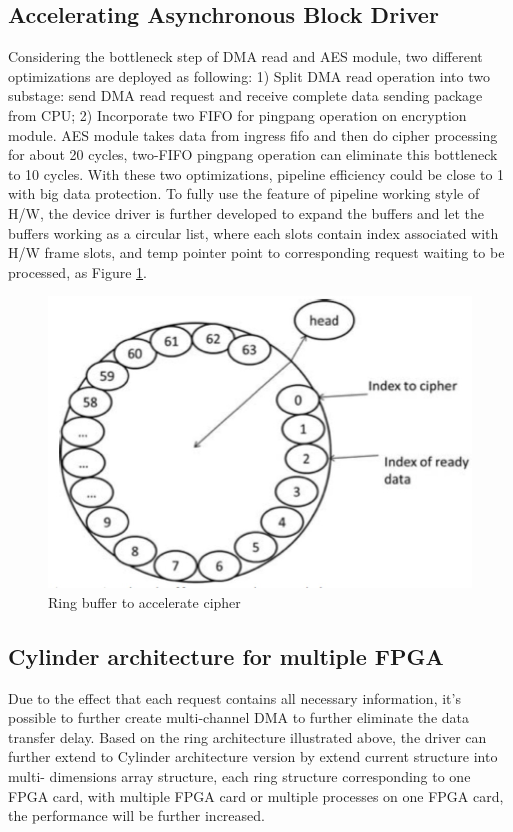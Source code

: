 \documentclass[10pt]{report}
\begin{document}
			\subsection{Accelerating Asynchronous Block Driver}
			Considering the bottleneck step of DMA read and AES module, two different optimizations are deployed as following: 1) Split DMA read operation into two substage: send DMA read request and receive complete data sending package from CPU; 2) Incorporate two FIFO for pingpang operation on encryption module. AES module takes data from ingress fifo and then do cipher processing for about 20 cycles, two-FIFO pingpang operation can eliminate this bottleneck to 10 cycles. With these two optimizations, pipeline efficiency could be close to 1 with big data protection.
			To fully use the feature of pipeline working style of H/W, the device driver is further developed to expand the buffers and let the buffers working as a circular list, where each slots contain index associated with H/W frame slots, and temp pointer point to corresponding request waiting to be processed, as Figure \ref{Figure 4}.
				
				\begin{figure}[ft]
				\includegraphics[width=\textwidth,height=\textheight,keepaspectratio] {fig4}
				\caption{Ring buffer to accelerate cipher}
				\label{Figure 4}
				\end{figure}
			
			\subsection{Cylinder architecture for multiple FPGA}
			Due to the effect that each request contains all necessary information, it's possible to further create multi-channel DMA to further eliminate the data transfer delay. Based on the ring architecture illustrated above, the driver can further extend to Cylinder architecture version by extend current structure into multi- dimensions array structure, each ring structure corresponding to one FPGA card, with multiple FPGA card or multiple processes on one FPGA card, the performance will be further increased.
\end{document}
